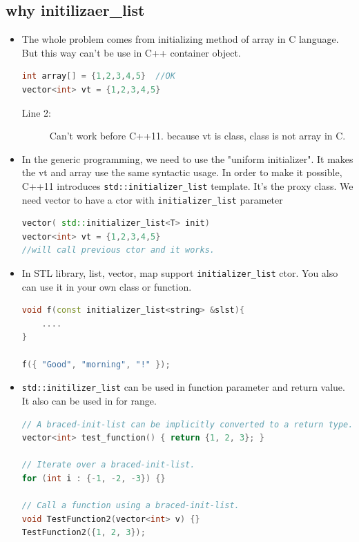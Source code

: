 \documentclass[a4paper,11pt,twoside]{book}
\begin{document}
\subsection{why initilizaer\_list}
\begin{itemize}
	\item The whole problem comes from initializing method of array in C language. But this way can't be use in C++ container object.
\begin{lstlisting}[frame=single, language=c++,mathescape=true]
int array[] = {1,2,3,4,5}  //OK 
vector<int> vt = {1,2,3,4,5} 
\end{lstlisting}
\begin{description}
	\item[Line 2:] Can't work before C++11. because vt is class, class is not array in C. 
\end{description}	
	
	\item In the generic programming, we need to use the "uniform initializer". It  makes the vt and array use the same syntactic usage. In order to make it possible, C++11 introduces \texttt{std::initializer\_list} template. It's the proxy class. We need vector to have a ctor with \texttt{initializer\_list} parameter
\begin{lstlisting}[frame=single, language=c++,mathescape=true]
vector( std::initializer_list<T> init)
vector<int> vt = {1,2,3,4,5} 
//will call previous ctor and it works. 
\end{lstlisting}
	
	
	
	\item In STL library, list, vector, map support \texttt{initializer\_list} ctor. You also can use it in your own class or function.
\begin{lstlisting}[frame=single, language=c++,mathescape=true]
void f(const initializer_list<string> &slst){
	....
}
	
f({ "Good", "morning", "!" });
\end{lstlisting}
	
	\item \texttt{std::initilizer\_list} can be used in function parameter and return value. It also can be used in for range.  
\begin{lstlisting}[frame=single, language=c++,mathescape=true]
// A braced-init-list can be implicitly converted to a return type.
vector<int> test_function() { return {1, 2, 3}; }
	
// Iterate over a braced-init-list.
for (int i : {-1, -2, -3}) {}
	
// Call a function using a braced-init-list.
void TestFunction2(vector<int> v) {}
TestFunction2({1, 2, 3}); 
\end{lstlisting}

\end{itemize}
\end{document}
